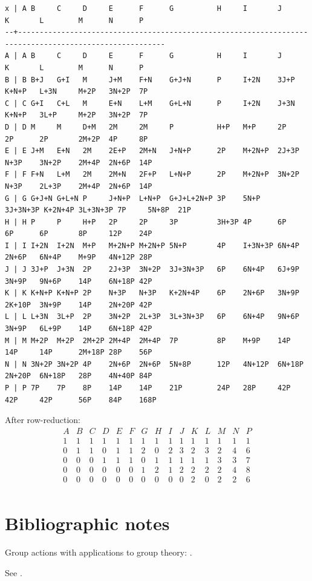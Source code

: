 \documentclass[11pt,oneside]{article}
\makeatletter
\newcommand{\verbatimfont}[1]{\renewcommand{\verbatim@font}{\ttfamily#1}}
\makeatother
\begin{document}
\verbatimfont{\scriptsize}%
\begin{verbatim}
x | A B     C     D     E      F      G          H     I       J        K       L        M      N      P    
--+--------------------------------------------------------------------------------------------------------
A | A B     C     D     E      F      G          H     I       J        K       L        M      N      P    
B | B B+J   G+I   M     J+M    F+N    G+J+N      P     I+2N    3J+P     K+N+P   L+3N     M+2P   3N+2P  7P   
C | C G+I   C+L   M     E+N    L+M    G+L+N      P     I+2N    J+3N     K+N+P   3L+P     M+2P   3N+2P  7P   
D | D M     M     D+M   2M     2M     P          H+P   M+P     2P       2P      2P       2M+2P  4P     8P   
E | E J+M   E+N   2M    2E+P   2M+N   J+N+P      2P    M+2N+P  2J+3P    N+3P    3N+2P    2M+4P  2N+6P  14P  
F | F F+N   L+M   2M    2M+N   2F+P   L+N+P      2P    M+2N+P  3N+2P    N+3P    2L+3P    2M+4P  2N+6P  14P  
G | G G+J+N G+L+N P     J+N+P  L+N+P  G+J+L+2N+P 3P    5N+P    3J+3N+3P K+2N+4P 3L+3N+3P 7P     5N+8P  21P  
H | H P     P     H+P   2P     2P     3P         3H+3P 4P      6P       6P      6P       8P     12P    24P  
I | I I+2N  I+2N  M+P   M+2N+P M+2N+P 5N+P       4P    I+3N+3P 6N+4P    2N+6P   6N+4P    M+9P   4N+12P 28P  
J | J 3J+P  J+3N  2P    2J+3P  3N+2P  3J+3N+3P   6P    6N+4P   6J+9P    3N+9P   9N+6P    14P    6N+18P 42P  
K | K K+N+P K+N+P 2P    N+3P   N+3P   K+2N+4P    6P    2N+6P   3N+9P    2K+10P  3N+9P    14P    2N+20P 42P  
L | L L+3N  3L+P  2P    3N+2P  2L+3P  3L+3N+3P   6P    6N+4P   9N+6P    3N+9P   6L+9P    14P    6N+18P 42P  
M | M M+2P  M+2P  2M+2P 2M+4P  2M+4P  7P         8P    M+9P    14P      14P     14P      2M+18P 28P    56P  
N | N 3N+2P 3N+2P 4P    2N+6P  2N+6P  5N+8P      12P   4N+12P  6N+18P   2N+20P  6N+18P   28P    4N+40P 84P  
P | P 7P    7P    8P    14P    14P    21P        24P   28P     42P      42P     42P      56P    84P    168P 
\end{verbatim}

After row-reduction:
$$
\begin{array}{rrrrrrrrrrrrrrrr}
 A & B & C & D & E & F & G & H & I & J & K & L & M & N & P \\
\hline
1 & 1 & 1 & 1 & 1 & 1 & 1 & 1 & 1 & 1 & 1 & 1 & 1 & 1 & 1 \\
0 & 1 & 1 & 0 & 1 & 1 & 2 & 0 & 2 & 3 & 2 & 3 & 2 & 4 & 6 \\
0 & 0 & 0 & 1 & 1 & 1 & 0 & 1 & 1 & 1 & 1 & 1 & 3 & 3 & 7 \\
0 & 0 & 0 & 0 & 0 & 0 & 1 & 2 & 1 & 2 & 2 & 2 & 2 & 4 & 8 \\
0 & 0 & 0 & 0 & 0 & 0 & 0 & 0 & 0 & 0 & 2 & 0 & 2 & 2 & 6 \\
\end{array}
$$

\section{Bibliographic notes}

Group actions with applications to group theory: \cite{ConradGroup,ConradTransitive}.

See \cite{Dress1971}.


{}

\end{document}
